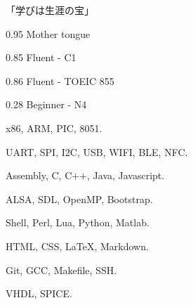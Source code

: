\documentclass{faresume}
\begin{document}
\begin{column}[\rightcolumnwidth]


		\addcontent
		{
			{\Large\begin{CJK}{UTF8}{min}「学びは生涯の宝」\end{CJK}}
		}{}{}{}{}


		{}{}{}{}

		{}{}{}{}

		{}{}{}{}

		{}{}{}{}

		{}{}{}{}


			{0.95}
			{Mother tongue}
			{}{}{}

			{0.85}
			{Fluent - C1}
			{}{}{}

			{0.86}
			{Fluent - TOEIC 855}
			{}{}{}

			{0.28}
			{Beginner - N4}
			{}{}{}


			{x86, ARM, PIC, 8051.}
			{}{}{}{}

			{UART, SPI, I2C, USB, WIFI, BLE, NFC.}
			{}{}{}{}

			{Assembly, C, C++, Java, Javascript.}
			{}{}{}{}

			{ALSA, SDL, OpenMP, Bootstrap.}
			{}{}{}{}

			{Shell, Perl, Lua, Python, Matlab.}
			{}{}{}{}

			{HTML, CSS, {\LaTeX}, Markdown.}
			{}{}{}{}

			{Git, GCC, Makefile, SSH.}
			{}{}{}{}

			{VHDL, SPICE.}
			{}{}{}{}



\end{column}
\end{document}
